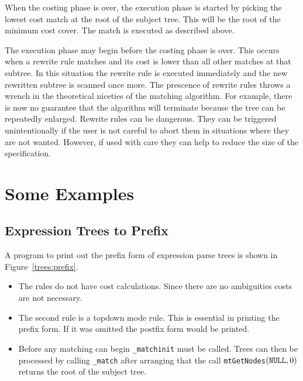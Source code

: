 \noindent When the costing phase is over, the execution phase is started
by picking the lowest cost match at the root of the subject tree.
This will be the root of the minimum cost cover.
The match is executed as described above.

The execution phase may begin before the costing phase is over.
This occurs when a rewrite rule matches and its cost is lower than
all other matches at that subtree.  In this situation the rewrite rule
is executed immediately and the new rewritten subtree is scanned once more.
The prescence of rewrite rules throws a wrench in the theoretical niceties
of the matching algorithm.  For example, there is now no guarantee
that the algorithm will terminate because the tree can
be repeatedly enlarged.
Rewrite rules can be dangerous.  They can
be triggered unintentionally if the user is not careful to abort them
in situations where they are not wanted.
However, if used with care they can help to reduce the size of the \twiglang{}
specification.

\section{Some Examples}

\subsection{Expression Trees to Prefix}
A \twiglang{} program to print out the prefix form of expression
parse trees
is shown in Figure~\ref{trees:prefix}.

\begin{itemize}

\item The rules do not have cost calculations.
Since there are no
ambiguities costs are not necessary.

\item The second rule is a topdown mode rule.  This is essential in printing
the prefix form.  If it was omitted the postfix form would be printed.

\item Before any matching can begin {\tt \_matchinit} must be called.
Trees can then be processed by calling {\tt \_match} after arranging that
the call
{\tt mtGetNodes}$({\tt NULL},0)$ returns the root of the subject tree.
\end{itemize}

